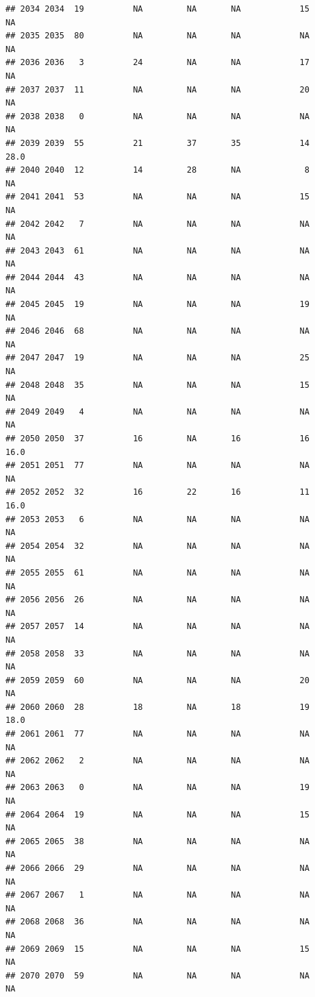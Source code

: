 \documentclass[man]{apa6}
\begin{document}
\begin{verbatim}
## 2034 2034  19          NA         NA       NA            15       NA
## 2035 2035  80          NA         NA       NA            NA       NA
## 2036 2036   3          24         NA       NA            17       NA
## 2037 2037  11          NA         NA       NA            20       NA
## 2038 2038   0          NA         NA       NA            NA       NA
## 2039 2039  55          21         37       35            14     28.0
## 2040 2040  12          14         28       NA             8       NA
## 2041 2041  53          NA         NA       NA            15       NA
## 2042 2042   7          NA         NA       NA            NA       NA
## 2043 2043  61          NA         NA       NA            NA       NA
## 2044 2044  43          NA         NA       NA            NA       NA
## 2045 2045  19          NA         NA       NA            19       NA
## 2046 2046  68          NA         NA       NA            NA       NA
## 2047 2047  19          NA         NA       NA            25       NA
## 2048 2048  35          NA         NA       NA            15       NA
## 2049 2049   4          NA         NA       NA            NA       NA
## 2050 2050  37          16         NA       16            16     16.0
## 2051 2051  77          NA         NA       NA            NA       NA
## 2052 2052  32          16         22       16            11     16.0
## 2053 2053   6          NA         NA       NA            NA       NA
## 2054 2054  32          NA         NA       NA            NA       NA
## 2055 2055  61          NA         NA       NA            NA       NA
## 2056 2056  26          NA         NA       NA            NA       NA
## 2057 2057  14          NA         NA       NA            NA       NA
## 2058 2058  33          NA         NA       NA            NA       NA
## 2059 2059  60          NA         NA       NA            20       NA
## 2060 2060  28          18         NA       18            19     18.0
## 2061 2061  77          NA         NA       NA            NA       NA
## 2062 2062   2          NA         NA       NA            NA       NA
## 2063 2063   0          NA         NA       NA            19       NA
## 2064 2064  19          NA         NA       NA            15       NA
## 2065 2065  38          NA         NA       NA            NA       NA
## 2066 2066  29          NA         NA       NA            NA       NA
## 2067 2067   1          NA         NA       NA            NA       NA
## 2068 2068  36          NA         NA       NA            NA       NA
## 2069 2069  15          NA         NA       NA            15       NA
## 2070 2070  59          NA         NA       NA            NA       NA

\end{verbatim}
\end{document}
